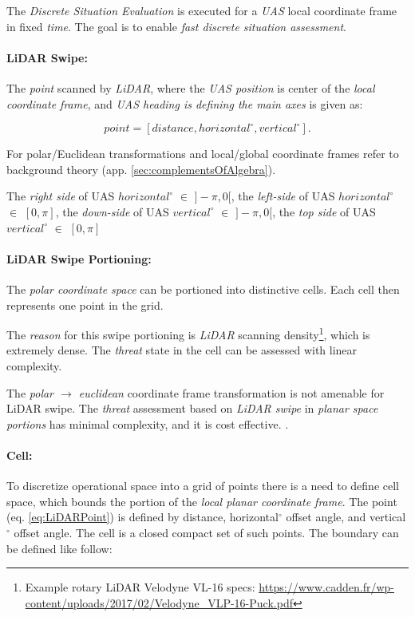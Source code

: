 The \emph{Discrete Situation Evaluation} is executed for a \emph{UAS} local coordinate frame in fixed \emph{time}.  The goal is to enable \emph{fast discrete situation assessment}. 


\paragraph{LiDAR Swipe:} The \emph{point} scanned by \emph{LiDAR}, where the \emph{UAS position} is center of the \emph{local coordinate frame}, and \emph{UAS heading is defining the main axes} is given as:

\begin{equation}\label{eq:LiDARPoint}
    point = [distance,horizontal^\circ,vertical^\circ].
\end{equation}

\begin{note}
    For polar/Euclidean transformations and local/global coordinate frames refer to background theory (app. \ref{sec:complementsOfAlgebra}). 
    
    The \emph{right side} of UAS $horizontal^\circ$ $\in$ $]-\pi,0[$, the \emph{left-side} of UAS $horizontal^\circ$ $\in$ $[0,\pi]$, the \emph{down-side} of UAS $vertical^\circ$ $\in$ $]-\pi,0[$, the \emph{top side} of UAS $vertical^\circ$ $\in$ $[0,\pi]$
\end{note}

\paragraph{LiDAR Swipe Portioning:} The \emph{polar coordinate space} can be portioned into distinctive cells. Each cell then represents one point in the grid.

The \emph{reason} for this swipe portioning is \emph{LiDAR} scanning density\footnote{Example rotary LiDAR Velodyne VL-16 specs: \url{https://www.cadden.fr/wp-content/uploads/2017/02/Velodyne_VLP-16-Puck.pdf}}, which is extremely dense. The \emph{threat} state in the cell can be assessed with linear complexity. 

The \emph{polar $\to$ euclidean} coordinate frame transformation is not amenable  for LiDAR swipe. The \emph{threat} assessment based on \emph{LiDAR swipe} in \emph{planar space portions} has minimal complexity, and it is cost effective. \cite{gupta2010comparative}.


\paragraph{Cell:} To discretize operational space into a grid of points there is a need to define cell space, which bounds the portion of the \emph{local planar coordinate frame}. The point (eq. \ref{eq:LiDARPoint}) is defined by distance, horizontal$^\circ$ offset angle, and vertical$^\circ$ offset angle. The cell is a closed compact set of such points. The boundary can be defined like follow: 

